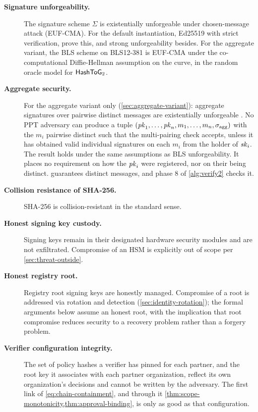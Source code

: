 \documentclass[11pt,a4paper]{article}
\begin{document}
\begin{description}
    \item[\textbf{Signature unforgeability.}] The signature scheme
    $\Sigma$ is existentially unforgeable under chosen-message attack
    (EUF-CMA). For the default instantiation, Ed25519 with strict
    verification, \citet{brendel2021ed25519} prove this, and strong
    unforgeability besides. For the aggregate variant, the BLS scheme
    \citep{boneh2001bls,ietf-bls-signature} on BLS12-381
    \citep{ietf-pairing-curves} is EUF-CMA under the co-computational
    Diffie-Hellman assumption on the curve, in the random oracle model
    for $\mathsf{HashToG}_2$.
    \item[\textbf{Aggregate security.}] For the aggregate variant
    only (\cref{sec:aggregate-variant}): aggregate signatures over
    pairwise distinct messages are existentially unforgeable
    \citep{bgls2003aggregate}. No PPT adversary can produce a tuple
    $(\mathit{pk}_1, \ldots, \mathit{pk}_n, m_1, \ldots, m_n, \sigma_{\text{agg}})$
    with the $m_i$ pairwise distinct such that the multi-pairing check
    accepts, unless it has obtained valid individual signatures on each
    $m_i$ from the holder of $\mathit{sk}_i$. The result holds under the same
    assumptions as BLS unforgeability. It places no requirement on how
    the $\mathit{pk}_i$ were registered, nor on their being distinct.
     guarantees distinct messages, and phase 8
    of \cref{alg:verify2} checks it.
    \item[\textbf{Collision resistance of SHA-256.}] SHA-256 is
    collision-resistant in the standard sense.
    \item[\textbf{Honest signing key custody.}] Signing keys remain in
    their designated hardware security modules and are not exfiltrated.
    Compromise of an HSM is explicitly out of scope per
    \cref{sec:threat-outside}.
    \item[\textbf{Honest registry root.}] Registry root signing keys
    are honestly managed. Compromise of a root is addressed via
    rotation and detection (\cref{sec:identity-rotation}); the
    formal arguments below assume an honest root, with the implication
    that root compromise reduces security to a recovery problem rather
    than a forgery problem.
    \item[\textbf{Verifier configuration integrity.}] The set of policy
    hashes a verifier has pinned for each partner, and the root key it
    associates with each partner organization, reflect its own
    organization's decisions and cannot be written by the adversary.
    The first link of \cref{eq:chain-containment}, and through it
    \cref{thm:scope-monotonicity,thm:approval-binding}, is only as good
    as that configuration.
\end{description}
\end{document}
